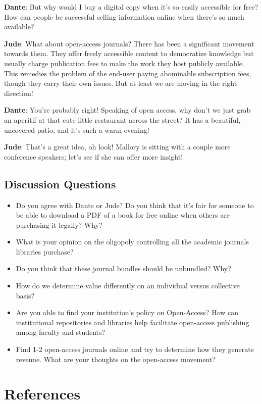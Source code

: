 \documentclass[
  letterpaper,
  DIV=11,
  numbers=noendperiod]{scrreprt}
\begin{document}
\textbf{Dante}: But why would I buy a digital copy when it's so easily
accessible for free? How can people be successful selling information
online when there's so much available?

\textbf{Jude}: What about open-access journals? There has been a
significant movement towards them. They offer freely accessible content
to democratize knowledge but usually charge publication fees to make the
work they host publicly available. This remedies the problem of the
end-user paying abominable subscription fees, though they carry their
own issues. But at least we are moving in the right direction!

\textbf{Dante}: You're probably right! Speaking of open access, why
don't we just grab an aperitif at that cute little restaurant across the
street? It has a beautiful, uncovered patio, and it's such a warm
evening!

\textbf{Jude}: That's a great idea, oh look! Mallory is sitting with a
couple more conference speakers; let's see if she can offer more
insight!

\subsection{Discussion Questions}\label{discussion-questions-3}

\begin{itemize}
\item
  Do you agree with Dante or Jude? Do you think that it's fair for
  someone to be able to download a PDF of a book for free online when
  others are purchasing it legally? Why?
\item
  What is your opinion on the oligopoly controlling all the academic
  journals libraries purchase?
\item
  Do you think that these journal bundles should be unbundled? Why?
\item
  How do we determine value differently on an individual versus
  collective basis?
\item
  Are you able to find your institution's policy on Open-Access? How can
  institutional repositories and libraries help facilitate open-access
  publishing among faculty and students?
\item
  Find 1-2 open-access journals online and try to determine how they
  generate revenue. What are your thoughts on the open-access movement?
\end{itemize}

\section{References}\label{references-6}
\end{document}

